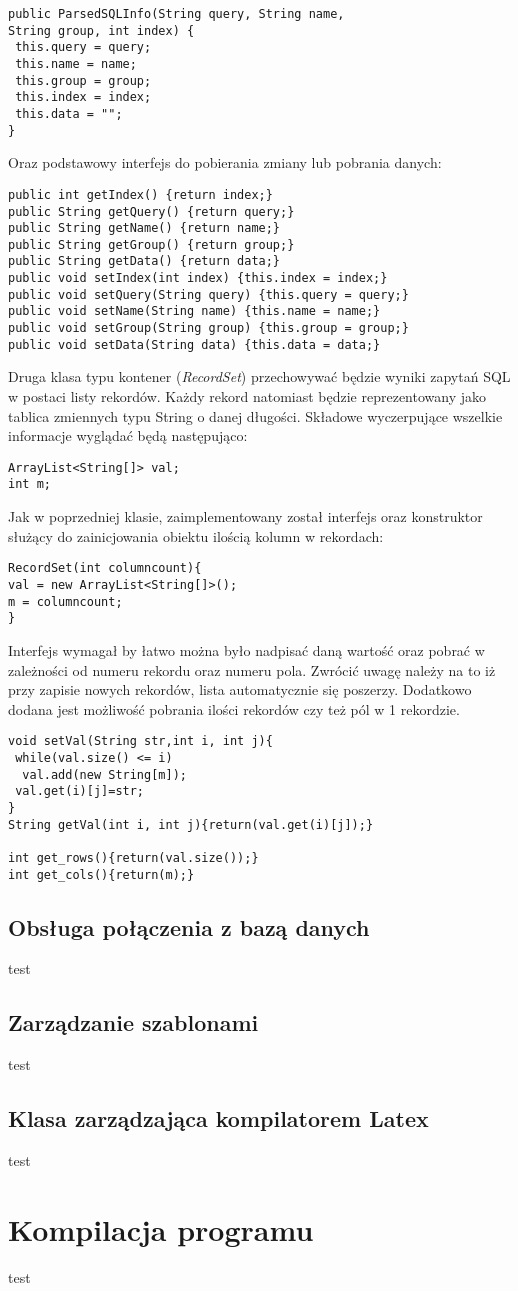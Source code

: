 \begin{lstlisting}
public ParsedSQLInfo(String query, String name,
String group, int index) {
 this.query = query;
 this.name = name;
 this.group = group;
 this.index = index;
 this.data = "";
}
\end{lstlisting}

Oraz podstawowy interfejs do pobierania zmiany lub pobrania danych:
\begin{lstlisting}
public int getIndex() {return index;}
public String getQuery() {return query;}
public String getName() {return name;}
public String getGroup() {return group;}
public String getData() {return data;}
public void setIndex(int index) {this.index = index;}
public void setQuery(String query) {this.query = query;}
public void setName(String name) {this.name = name;}
public void setGroup(String group) {this.group = group;}
public void setData(String data) {this.data = data;}
\end{lstlisting}


Druga klasa typu kontener (\emph{RecordSet}) przechowywać będzie wyniki zapytań SQL w postaci listy rekordów. Każdy rekord natomiast będzie reprezentowany jako tablica zmiennych typu String o danej długości. Składowe wyczerpujące wszelkie informacje wyglądać będą następująco:

\begin{lstlisting}
ArrayList<String[]> val;
int m;
\end{lstlisting}

Jak w poprzedniej klasie, zaimplementowany został interfejs oraz konstruktor służący do zainicjowania obiektu ilością kolumn w rekordach:
 \begin{lstlisting}
RecordSet(int columncount){
val = new ArrayList<String[]>();
m = columncount;
}
 \end{lstlisting}

Interfejs wymagał by łatwo można było nadpisać daną wartość oraz pobrać w zależności od numeru rekordu oraz numeru pola. Zwrócić uwagę należy na to iż przy zapisie nowych rekordów, lista automatycznie się poszerzy. Dodatkowo dodana jest możliwość pobrania ilości rekordów czy też pól w 1 rekordzie.
 \begin{lstlisting}
void setVal(String str,int i, int j){
 while(val.size() <= i)
  val.add(new String[m]);
 val.get(i)[j]=str;
}
String getVal(int i, int j){return(val.get(i)[j]);}   

int get_rows(){return(val.size());}
int get_cols(){return(m);}
\end{lstlisting}

\subsection{Obsługa połączenia z bazą danych}
test

\subsection{Zarządzanie szablonami}
test
\subsection{Klasa zarządzająca kompilatorem Latex}
test
\section{ Kompilacja programu}
test